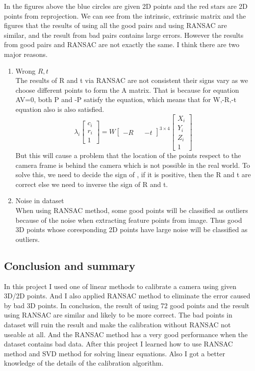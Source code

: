 \documentclass{article}
\begin{document}
In the figures above the blue circles are given 2D points and the red stars are 2D points from reprojection.
We can see from the intrinsic, extrinsic matrix and the figures that the results of using all the good pairs and using RANSAC are similar, and the result from bad pairs contains large errors. However the results from good pairs and RANSAC are not exactly the same. I think there are two major reasons.
\begin{enumerate}
\item Wrong $R,t$\\
The results of R and t via RANSAC are not consistent their signs vary as we choose different points to form the A matrix. That is because for equation AV=0, both P and -P satisfy the equation, which means that for W,-R,-t equation also is also satisfied.
\begin{equation}
\lambda_i\begin{bmatrix}c_i\\r_i\\1\end{bmatrix}=W\begin{bmatrix}-R&&-t\end{bmatrix}^{3\times4}\begin{bmatrix}X_i\\Y_i\\Z_i\\1\end{bmatrix}
\end{equation}
But this will cause a problem that the location of the points respect to the camera frame is behind the camera which is not possible in the real world.
To solve this, we need to decide the sign of , if it is positive, then the R and t are correct else we need to inverse the sign of R and t.
\item Noise in dataset\\
When using RANSAC method, some good points will be classified as outliers because of the noise when extracting feature points from image. Thus good 3D points whose coresponding 2D points have large noise will be classified as outliers. 
\end{enumerate}
\subsection*{Conclusion and summary}
In this project I used one of linear methods to calibrate a camera using given 3D/2D points. And I also applied RANSAC method to eliminate the error caused by bad 3D points. In conclusion, the result of using 72 good points and the result using RANSAC are similar and likely to be more correct. The bad points in dataset will ruin the result and make the calibration without RANSAC not useable at all. And the RANSAC method has a very good performance when the dataset contains bad data. After this project I learned how to use RANSAC method and SVD method for solving linear equations. Also I got a better knowledge of the details of the calibration algorithm. 
\newpage
\end{document}
